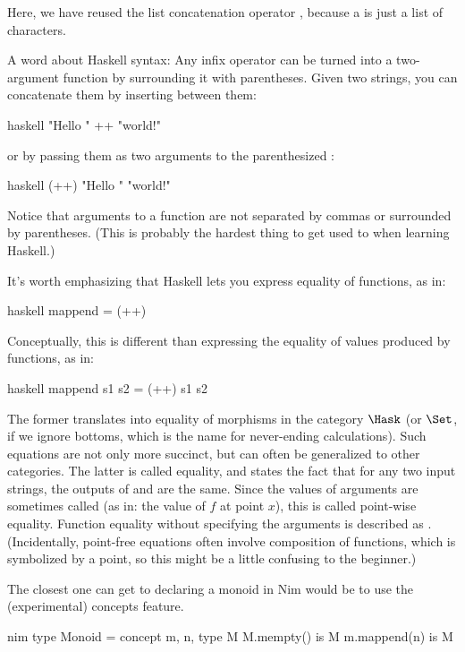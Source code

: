 Here, we have reused the list concatenation operator \code{(++)},
because a  is just a list of characters.

A word about Haskell syntax: Any infix operator can be turned into a
two-argument function by surrounding it with parentheses. Given two
strings, you can concatenate them by inserting \code{++} between them:

\begin{snip}{haskell}
"Hello " ++ "world!"
\end{snip}
or by passing them as two arguments to the parenthesized \code{(++)}:

\begin{snip}{haskell}
(++) "Hello " "world!"
\end{snip}
Notice that arguments to a function are not separated by commas or
surrounded by parentheses. (This is probably the hardest thing to get
used to when learning Haskell.)

It's worth emphasizing that Haskell lets you express equality of
functions, as in:

\begin{snip}{haskell}
mappend = (++)
\end{snip}
Conceptually, this is different than expressing the equality of values
produced by functions, as in:

\begin{snip}{haskell}
mappend s1 s2 = (++) s1 s2
\end{snip}
The former translates into equality of morphisms in the category
$\Hask$ (or $\Set$, if we ignore bottoms, which is the name
for never-ending calculations). Such equations are not only more
succinct, but can often be generalized to other categories. The latter
is called  equality, and states the fact that for any
two input strings, the outputs of  and \code{(++)} are
the same. Since the values of arguments are sometimes called
 (as in: the value of $f$ at point $x$), this is called
point-wise equality. Function equality without specifying the arguments
is described as . (Incidentally, point-free equations
often involve composition of functions, which is symbolized by a point,
so this might be a little confusing to the beginner.)

The closest one can get to declaring a monoid in Nim would be to use the
(experimental) concepts feature.

\begin{snip}{nim}
type Monoid = concept m, n, type M
  M.mempty() is M
  m.mappend(n) is M
\end{snip}

